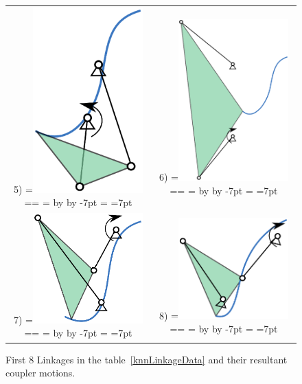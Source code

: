 \documentclass[twocolumn,10pt]{asme2e}
\makeatletter
\newcommand{\putindeepbox}[2][0.7\baselineskip]{{%
    \setbox0=\hbox{#2}%
    \setbox0=\vbox{\noindent\hsize=\wd0\unhbox0}
    \@tempdima=\dp0
    \advance\@tempdima by \ht0
    \advance\@tempdima by -#1\relax
    \dp0=\@tempdima
    \ht0=#1\relax
    \box0
}}
\makeatother
\begin{document}
\begin{figure}
\begin{tabular}{cc}
  5)\putindeepbox[7pt]{\includegraphics[width=120pt]{figure/path_solutions/path_sol5.eps}}
    & 6)\putindeepbox[7pt]{\includegraphics[width=120pt]{figure/path_solutions/path_sol6.eps}} \\
  7)\putindeepbox[7pt]{\includegraphics[width=120pt]{figure/path_solutions/path_sol7.eps}}
    & 8)\putindeepbox[7pt]{\includegraphics[width=120pt]{figure/path_solutions/path_sol8.eps}}\\
\end{tabular}
\caption{First 8 Linkages in the table~\ref{knnLinkageData} and their resultant coupler motions.}
\label{ex1_solns}
\end{figure}
\end{document}
